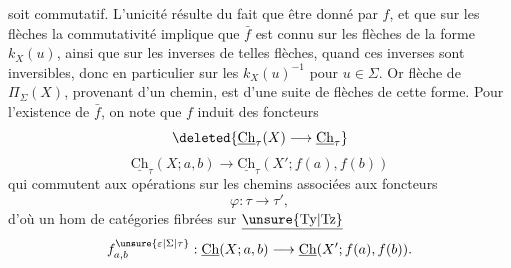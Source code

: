 soit commutatif. L'unicité résulte du fait que  être donné par $f$, et que sur les flèches la commutativité  implique que $\bar f$ est connu sur les flèches de la forme $k_X(u)$, ainsi  que sur les inverses de telles flèches, quand ces inverses sont inversibles, donc en particulier sur les $k_X(u)^{-1}$ pour $u\in\Sigma$. Or  flèche de $\Pi_\Sigma(X)$, provenant d'un chemin, est  d'une suite de flèches de cette forme.
Pour l'existence de $\bar f$, on note que $f$ induit des foncteurs
\[\deleted{\underline{\mathrm{Ch}}_\tau(X)\longrightarrow\underline{\mathrm{Ch}}_\tau}\]
\[\underline{\mathrm{Ch}}_\tau(X;a,b)\longrightarrow\underline{\mathrm{Ch}}_\tau(X';f(a),f(b))\]
qui commutent aux opérations  sur les chemins associées aux foncteurs
\[\varphi:\tau\longrightarrow\tau',\]
d'où un hom de catégories fibrées sur $\underline{\unsure{\mathrm{Ty}|\mathrm{Tz}}}$
\[f_{a,b}^{\unsure{\varepsilon|\Sigma|\tau}}:\underline{\mathrm{Ch}}(X;a,b)\longrightarrow\underline{\mathrm{Ch}}(X';f(a),f(b)).\]
